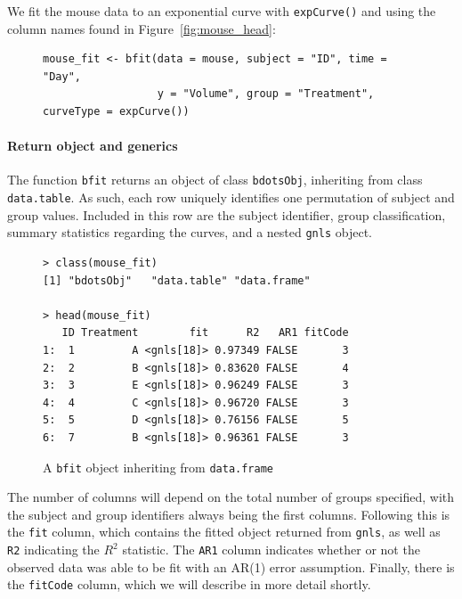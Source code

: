 \documentclass{article}
\newcommand{\xt}{\texttt}%
\begin{document}
We fit the mouse data to an exponential curve with \xt{expCurve()} and using the column names found in Figure~\ref{fig:mouse_head}:

\begin{singlespace}
\begin{figure}[H]
\centering
\begin{BVerbatim}
mouse_fit <- bfit(data = mouse, subject = "ID", time = "Day", 
                  y = "Volume", group = "Treatment", curveType = expCurve())
\end{BVerbatim}
\label{fig:bfit_example}
\end{figure}
\end{singlespace}


\paragraph{Return object and generics}


The function \texttt{bfit} returns an object of class \texttt{bdotsObj}, inheriting from class \texttt{data.table}. As such, each row uniquely identifies one permutation of subject and group values. Included in this row are the subject identifier, group classification, summary statistics regarding the curves, and a nested \xt{gnls} object. 

\begin{singlespace}
\begin{figure}[H]
\centering
\begin{BVerbatim}
> class(mouse_fit)
[1] "bdotsObj"   "data.table" "data.frame"

> head(mouse_fit)
   ID Treatment        fit      R2   AR1 fitCode
1:  1         A <gnls[18]> 0.97349 FALSE       3
2:  2         B <gnls[18]> 0.83620 FALSE       4
3:  3         E <gnls[18]> 0.96249 FALSE       3
4:  4         C <gnls[18]> 0.96720 FALSE       3
5:  5         D <gnls[18]> 0.76156 FALSE       5
6:  7         B <gnls[18]> 0.96361 FALSE       3
\end{BVerbatim}
\caption{A \xt{bfit} object inheriting from \xt{data.frame}}
\label{fig:bdotsObj}
\end{figure}
\end{singlespace}

The number of columns will depend on the total number of groups specified, with the subject and group identifiers always being the first columns. Following this is the \xt{fit} column, which contains the fitted object returned from \xt{gnls}, as well as \xt{R2} indicating the $R^2$ statistic. The \xt{AR1} column indicates whether or not the observed data was able to be fit with an AR(1) error assumption. Finally, there is the \xt{fitCode} column, which we will describe in more detail shortly.
\end{document}
